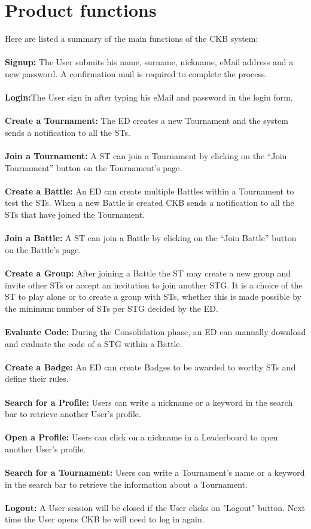 \section{Product functions}
\label{sec:product_functions}%
Here are listed a summary of the main functions of the CKB system:\\\\
\textbf{ Signup:} The User submits his name, surname, nickname, eMail address and a new password. A confirmation mail is required to complete the process.\\\\
\textbf{ Login:}The User sign in after typing his eMail and password in the login form. \\\\  
\textbf{ Create a Tournament:} The ED creates a new Tournament and the system sends a notification to all the STs.\\\\
\textbf{ Join a Tournament:} A ST can join a Tournament by clicking on the “Join Tournament” button on the Tournament’s page.\\\\
\textbf{ Create a Battle:} An ED can create multiple Battles within a Tournament to test the STs. When a new Battle is created CKB sends a notification to all the STs that have joined the Tournament.\\\\
\textbf{ Join a Battle:} A ST can join a Battle by clicking on the “Join Battle” button on the Battle’s page.\\\\
\textbf{ Create a Group:} After joining a Battle the ST may create a new group and invite other STs or accept an invitation to join another STG. It is a choice of the ST to play alone or to create a group with STs, whether this is made possible by the minimum number of STs per STG decided by the ED.\\\\
\textbf{ Evaluate Code:} During the Consolidation phase, an ED can manually download and evaluate the code of a STG within a Battle.\\\\
\textbf{ Create a Badge:} An ED can create Badges to be awarded to worthy STs and define their rules.\\\\
\textbf{ Search for a Profile:} Users can write a nickname or a keyword in the search bar to retrieve another User’s profile.\\\\
\textbf{ Open a Profile:} Users can click on a nickname in a Leaderboard to open another User’s profile.\\\\
\textbf{ Search for a Tournament:} Users can write a Tournament's name or a keyword in the search bar to retrieve the information about a Tournament.\\\\
\textbf{ Logout:} A User session will be closed if the User clicks on "Logout" button. Next time the User opens CKB he will need to log in again.


